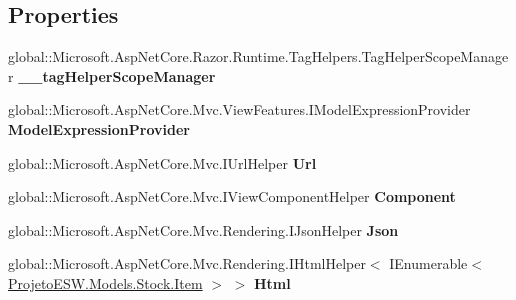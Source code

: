 \subsection*{Properties}
\begin{DoxyCompactItemize}
\item 
\mbox{\label{class_asp_net_core_1_1_views___items___index_ad5ee2d281ab54621fb1f41ede3bb28d9}} 
global\+::\+Microsoft.\+Asp\+Net\+Core.\+Razor.\+Runtime.\+Tag\+Helpers.\+Tag\+Helper\+Scope\+Manager {\bfseries \+\_\+\+\_\+tag\+Helper\+Scope\+Manager}
\item 
\mbox{\label{class_asp_net_core_1_1_views___items___index_aae91dae3c5f0410f39c01c009ad0526d}} 
global\+::\+Microsoft.\+Asp\+Net\+Core.\+Mvc.\+View\+Features.\+I\+Model\+Expression\+Provider {\bfseries Model\+Expression\+Provider}
\item 
\mbox{\label{class_asp_net_core_1_1_views___items___index_a6e2dd60d02681b5554accffa9092e59d}} 
global\+::\+Microsoft.\+Asp\+Net\+Core.\+Mvc.\+I\+Url\+Helper {\bfseries Url}
\item 
\mbox{\label{class_asp_net_core_1_1_views___items___index_a1fdea48250ed129d560986869d27cd6a}} 
global\+::\+Microsoft.\+Asp\+Net\+Core.\+Mvc.\+I\+View\+Component\+Helper {\bfseries Component}
\item 
\mbox{\label{class_asp_net_core_1_1_views___items___index_a3e791b874e9d3a47f501542f47d68ea1}} 
global\+::\+Microsoft.\+Asp\+Net\+Core.\+Mvc.\+Rendering.\+I\+Json\+Helper {\bfseries Json}
\item 
\mbox{\label{class_asp_net_core_1_1_views___items___index_acf7d1e1cc1d1ab0e438b51075e77c15e}} 
global\+::\+Microsoft.\+Asp\+Net\+Core.\+Mvc.\+Rendering.\+I\+Html\+Helper$<$ I\+Enumerable$<$ \mbox{\hyperlink{class_projeto_e_s_w_1_1_models_1_1_stock_1_1_item}{Projeto\+E\+S\+W.\+Models.\+Stock.\+Item}} $>$ $>$ {\bfseries Html}
\end{DoxyCompactItemize}
